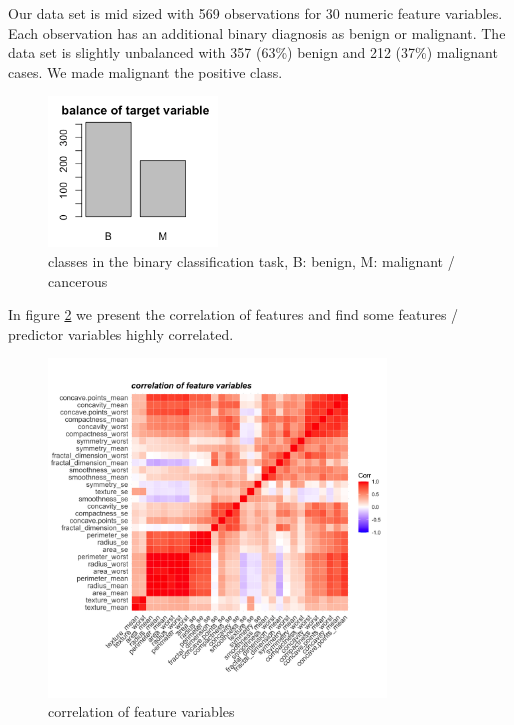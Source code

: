 \documentclass[]{article}
\begin{document}
Our data set is mid sized with 569 observations for 30 numeric feature
variables. Each observation has an additional binary diagnosis as benign
or malignant. The data set is slightly unbalanced with 357 (63\%) benign
and 212 (37\%) malignant cases. We made malignant the positive class.

\begin{figure}
    \centering
    \includegraphics[width=0.4\textwidth]{images/binary-classification.png}
    \caption{classes in the binary classification task, B: benign, M: malignant / cancerous}
    \label{fig:bin_class}
\end{figure}

In figure \ref{fig:cor-1} we present the correlation of features and
find some features / predictor variables highly correlated.

\begin{figure}
    \centering
    \includegraphics[width=0.8\textwidth]{images/correlation-features.png}
    \caption{correlation of feature variables}
    \label{fig:cor-1}
\end{figure}
\end{document}
